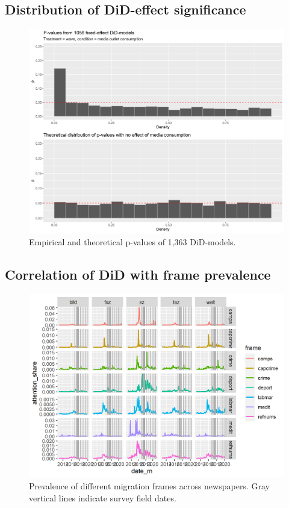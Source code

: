 \documentclass{article}
\begin{document}

\subsection{Distribution of DiD-effect significance}

\begin{figure}[!ht]
    \centering
    \includegraphics[width=\textwidth]{paper/vis/DiD_model_ps.png}
    \caption{Empirical and theoretical p-values of 1,363 DiD-models.}
    \label{fig:p_values}
\end{figure}

\subsection{Correlation of DiD with frame prevalence}

\begin{figure}[!ht]
    \centering
    \includegraphics[width=\textwidth]{paper/vis/frames_papers_wtd.png}
    \caption{Prevalence of different migration frames across newspapers. Gray vertical lines indicate survey field dates.}
    \label{fig:frames}
\end{figure}
\end{document}
